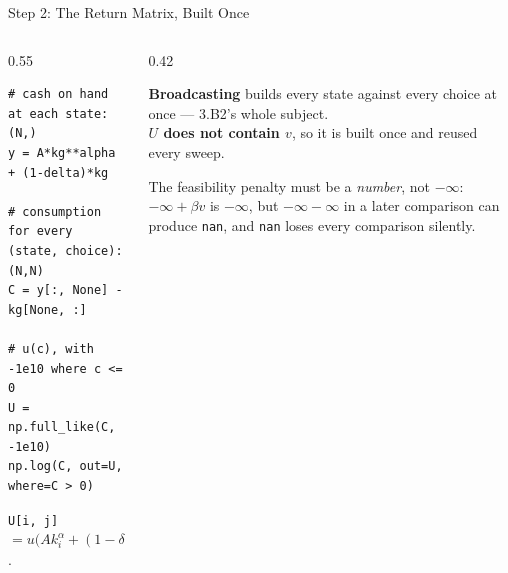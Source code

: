 \begin{frame}[fragile]{Step 2: The Return Matrix, Built Once}
\begin{columns}[T]
\begin{column}{0.55\textwidth}
\begin{lstlisting}
# cash on hand at each state: (N,)
y = A*kg**alpha + (1-delta)*kg

# consumption for every (state, choice): (N,N)
C = y[:, None] - kg[None, :]

# u(c), with -1e10 where c <= 0
U = np.full_like(C, -1e10)
np.log(C, out=U, where=C > 0)
\end{lstlisting}
\vspace{-1mm}
\footnotesize
\texttt{U[i, j]} $=u\big(Ak_i^{\alpha}+(1-\delta)k_i-k_j\big)$.
\end{column}
\begin{column}{0.42\textwidth}
\begin{conceptbox}[title=\textbf{Two ideas in six lines}]\small
\textbf{Broadcasting} builds every state against every choice at once --- 3.B2's whole subject.\\[1mm]
\textbf{$U$ does not contain $v$}, so it is built once and reused every sweep.
\end{conceptbox}
\medskip
\begin{cautionbox}\footnotesize
The feasibility penalty must be a \emph{number}, not $-\infty$: $-\infty+\beta v$ is $-\infty$, but $-\infty-\infty$ in a later comparison can produce \texttt{nan}, and \texttt{nan} loses every comparison silently.
\end{cautionbox}
\end{column}
\end{columns}
\end{frame}

